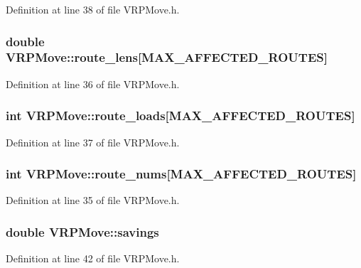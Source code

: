 Definition at line 38 of file VRPMove.h.

\hypertarget{class_v_r_p_move_aea86fc574c4e56c9b1ae0564d0de2ea6}{
\subsubsection[{route\_\-lens}]{\setlength{\rightskip}{0pt plus 5cm}double {\bf VRPMove::route\_\-lens}\mbox{[}MAX\_\-AFFECTED\_\-ROUTES\mbox{]}}}
\label{class_v_r_p_move_aea86fc574c4e56c9b1ae0564d0de2ea6}


Definition at line 36 of file VRPMove.h.

\hypertarget{class_v_r_p_move_a4761d4ac82fb507e7afa8196b3f9a288}{
\subsubsection[{route\_\-loads}]{\setlength{\rightskip}{0pt plus 5cm}int {\bf VRPMove::route\_\-loads}\mbox{[}MAX\_\-AFFECTED\_\-ROUTES\mbox{]}}}
\label{class_v_r_p_move_a4761d4ac82fb507e7afa8196b3f9a288}


Definition at line 37 of file VRPMove.h.

\hypertarget{class_v_r_p_move_ad806f6cdca7081fc5ae7d087a8d4180f}{
\subsubsection[{route\_\-nums}]{\setlength{\rightskip}{0pt plus 5cm}int {\bf VRPMove::route\_\-nums}\mbox{[}MAX\_\-AFFECTED\_\-ROUTES\mbox{]}}}
\label{class_v_r_p_move_ad806f6cdca7081fc5ae7d087a8d4180f}


Definition at line 35 of file VRPMove.h.

\hypertarget{class_v_r_p_move_a824d4dbc2ba2328d6d6f9a361dc979d7}{
\subsubsection[{savings}]{\setlength{\rightskip}{0pt plus 5cm}double {\bf VRPMove::savings}}}
\label{class_v_r_p_move_a824d4dbc2ba2328d6d6f9a361dc979d7}


Definition at line 42 of file VRPMove.h.

